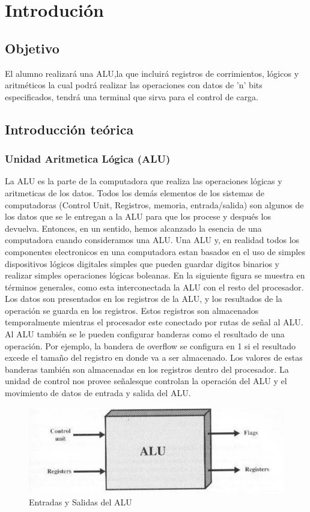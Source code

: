  \section{Introduci\'on}
	\subsection{Objetivo}
		\setlength{\parindent}{1em}
		\setlength{\parskip}{10pt}
			El alumno realizar\'a una ALU,la que incluir\'a registros de corrimientos, l\'ogicos y aritm\'eticos la cual podr\'a realizar las operaciones con datos de 'n' bits especificados, tendr\'a una terminal que sirva para el control de carga.
	\subsection{Introducci\'on te\'orica}
		\subsubsection{Unidad Aritmetica L\'ogica (ALU)}
			La ALU es la parte de la computadora que realiza las operaciones l\'ogicas y aritmeticas de los datos. Todos los dem\'as elementos de los sistemas de computadoras (Control Unit, Registros, memoria, entrada/salida) son algunos de los datos que se le entregan a la ALU para que los procese y despu\'es los devuelva. Entonces, en un sentido, hemos alcanzado la esencia de una computadora cuando consideramos una ALU.
\vskip 1pt
	Una ALU y, en realidad todos los componentes electronicos en una computadora estan basados en el uso de simples dispositivos l\'ogicos digitales simples que pueden guardar digitos binarios y realizar simples operaciones l\'ogicas boleanas.
\vskip 1pt
	En la siguiente figura se muestra en t\'erminos generales, como esta interconectada la ALU con el resto del procesador. Los datos son presentados en los registros de la ALU, y los resultados de la operaci\'on se guarda en los registros. Estos registros son almacenados temporalmente mientras el procesador este conectado por rutas de se\~nal al ALU. Al ALU tambi\'en se le pueden configurar banderas como el resultado de una operaci\'on. Por ejemplo, la bandera de overflow se configura en 1 si el resultado excede el tama\~no del registro en donde va a ser almacenado. Los valores de estas banderas tambi\'en son almacenadas en los registros dentro del procesador. La unidad de control nos provee se\~nalesque controlan la operaci\'on del ALU y el movimiento de datos de entrada y salida del ALU.
	\begin{figure}[h]
			\centering		
			\includegraphics[width=\textwidth]{IOALU}
			\caption{Entradas y Salidas del ALU}
	\end{figure}
